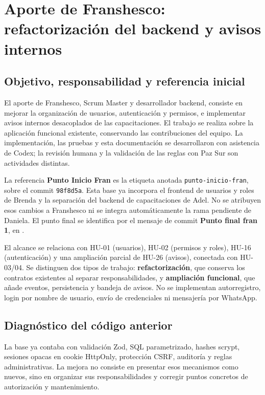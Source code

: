 \chapter{Aporte de Franshesco: refactorización del backend y avisos internos}
\label{cap:franshesco}

\section{Objetivo, responsabilidad y referencia inicial}
El aporte de Franshesco, Scrum Master y desarrollador backend, consiste en mejorar
la organización de usuarios, autenticación y permisos, e implementar avisos internos
desacoplados de las capacitaciones. El trabajo se realiza sobre la aplicación
funcional existente, conservando las contribuciones del equipo. La implementación,
las pruebas y esta documentación se desarrollaron con asistencia de Codex; la
revisión humana y la validación de las reglas con Paz Sur son actividades distintas.

La referencia \textbf{Punto Inicio Fran} es la etiqueta anotada
\texttt{punto-inicio-fran}, sobre el commit \texttt{98f8d5a}. Esta base ya incorpora
el frontend de usuarios y roles de Brenda y la separación del backend de
capacitaciones de Adel. No se atribuyen esos cambios a Franshesco ni se integra
automáticamente la rama pendiente de Daniela. El punto final se identifica por
el mensaje de commit \textbf{Punto final fran 1}, en .

El alcance se relaciona con HU-01 (usuarios), HU-02 (permisos y roles), HU-16
(autenticación) y una ampliación parcial de HU-26 (avisos), conectada con HU-03/04.
Se distinguen dos tipos de trabajo: \textbf{refactorización}, que conserva los
contratos existentes al separar responsabilidades, y \textbf{ampliación funcional},
que añade eventos, persistencia y bandeja de avisos. No se implementan autorregistro,
login por nombre de usuario, envío de credenciales ni mensajería por WhatsApp.

\section{Diagnóstico del código anterior}
La base ya contaba con validación Zod, SQL parametrizado, hashes scrypt, sesiones
opacas en cookie HttpOnly, protección CSRF, auditoría y reglas administrativas.
La mejora no consiste en presentar esos mecanismos como nuevos, sino en organizar
sus responsabilidades y corregir puntos concretos de autorización y mantenimiento.

